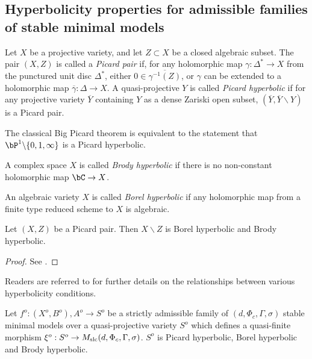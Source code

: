 \documentclass[11pt,letterpaper]{amsart}
\numberwithin{equation}{section}
\begin{document}
	\subsection{Hyperbolicity properties for admissible families of stable minimal models}
	\begin{defn}
		Let $X$ be a projective variety, and let $Z \subset X$ be a closed algebraic subset. The pair $(X, Z)$ is called a \emph{Picard pair} if, for any holomorphic map $\gamma: \Delta^\ast \to X$ from the punctured unit disc $\Delta^\ast$, either $0 \in \overline{\gamma^{-1}(Z)}$, or $\gamma$ can be extended to a holomorphic map $\overline{\gamma}: \Delta \to X$. A quasi-projective $Y$ is called \emph{Picard hyperbolic} if for any projective variety $\overline{Y}$ containing $Y$ as a dense Zariski open subset, $(\overline{Y},\overline{Y}\backslash Y)$ is a Picard pair.
	\end{defn}
	The classical Big Picard theorem is equivalent to the statement that $\bP^1\backslash\{0, 1, \infty\}$ is a Picard hyperbolic.
	\begin{defn}
		A complex space $X$ is called \emph{Brody hyperbolic} if there is no non-constant holomorphic map $\bC\to X$.
	\end{defn}
	\begin{defn}
		An algebraic variety $X$ is called \emph{Borel hyperbolic} if any holomorphic map from a finite type reduced scheme to $X$ is algebraic.
	\end{defn}
	\begin{prop}\label{prop_BPT_BH}
		Let $(X,Z)$ be a Picard pair. Then $X\backslash Z$ is Borel hyperbolic and Brody hyperbolic.
	\end{prop}
	\begin{proof}
		See \cite[Theorem 3.13]{Javanpeykar2020}.
	\end{proof}
	Readers are referred to \cite{Lang1987,   Javanpeykar2020} for further details on the relationships between various hyperbolicity conditions.
	\begin{thm}\label{thm_main_proof}
		Let $f^o:(X^o,B^o),A^o\to S^o$ be a strictly admissible family of $(d,\Phi_c,\Gamma,\sigma)$ stable minimal models over a quasi-projective variety $S^o$ which defines a quasi-finite morphism $\xi^o:S^o\to M_{\rm slc}(d,\Phi_c,\Gamma,\sigma)$.
		$S^o$ is Picard hyperbolic, Borel hyperbolic and Brody hyperbolic.
	\end{thm}
\end{document}
